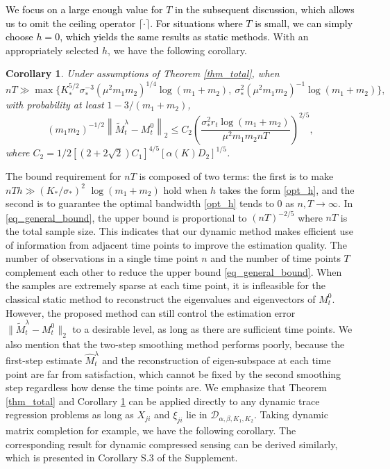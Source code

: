 \documentclass[12pt]{article}
\newcommand{\oldchange}[1]{\textcolor{black}{#1}}
\newtheorem{cor}{Corollary}
\begin{document}
  \oldchange{We focus on a large enough value for $T$ in the subsequent discussion, which allows us to omit the ceiling operator $\lceil\cdot \rceil$. For situations where $T$ is small, we can simply choose $h=0$, which yields the same results as static methods.}
  With an appropriately selected $h$, we have the following corollary.
  \begin{cor}
  \label{cor_general_result}
  Under assumptions of Theorem \ref{thm_total}, when 
  $$ nT\gg\max\{K_*^{5/2}\sigma_*^{-3}(\mu^{2}m_1m_2)^{1/4}\log(m_1+m_2),\ \sigma_*^2(\mu^{2}m_1m_2)^{-1}\log(m_1+m_2)\},$$
  with probability at least $1-3/(m_1+m_2)$,
  \begin{equation}\label{eq_general_bound}
  (m_1m_2)^{-1/2}\left\|\widetilde{M}_t^\lambda - M_t^0\right\|_2 \le C_2\left(\frac{\sigma_*^2r_t\log(m_1+m_2)}{\mu^2m_1m_2 n T}\right)^{2/5},
  \end{equation}
  where $C_2 =1/2\left[(2+2\sqrt{2})C_1\right]^{4/5}\left[\alpha(K)D_2\right]^{1/5}$.
  \end{cor}

  The bound requirement for $nT$ is composed of two terms: the first is to make $n T h \gg (K_*/\sigma_*)^2 $ $\log(m_1+m_2)$ hold when $h$ takes the form \eqref{opt_h}, and the second is to guarantee the optimal bandwidth \eqref{opt_h} tends to 0 as $n,T\rightarrow\infty$.
  In \eqref{eq_general_bound}, the upper bound is proportional to $(nT)^{-2/5}$ where $n T$ is the total sample size. This indicates that our dynamic method makes efficient use of information from adjacent time points to improve the estimation quality. 
  The number of observations in a single time point $n$ and the number of time points $T$ complement each other to reduce the upper bound \eqref{eq_general_bound}. 
  When the samples are extremely sparse at each time point, it is infleasible for the classical static method to reconstruct the eigenvalues and eigenvectors of $M_t^0$. However, the proposed method can still control the estimation error $\|\widetilde{M}^\lambda_t-M^0_t\|_2$ to a desirable level, as long as there are sufficient time points. We also mention that the two-step smoothing method performs poorly, because the first-step estimate $\widehat{M}_t^\lambda$ and the reconstruction of eigen-subspace at each time point are far from satisfaction, which cannot be fixed by the second smoothing step regardless how dense the time points are. We emphasize that Theorem \ref{thm_total} and Corollary \ref{cor_general_result} can be applied directly to any dynamic trace regression problems as long as $X_{ji}$ and $\xi_{ji}$ lie in $\mathcal{D}_{\alpha,\beta,K_1,K_2}$. Taking dynamic matrix completion for example, we have the following corollary. The corresponding result for dynamic compressed sensing can be derived similarly, which is presented in Corollary S.3 of the Supplement.
\end{document}
